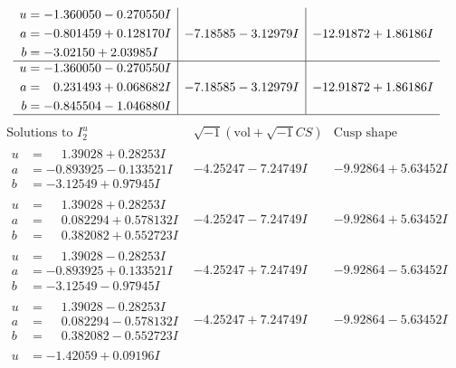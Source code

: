 \documentclass[1p]{elsarticle_modified}
\theoremstyle{definition}
\newcommand{\I}{\sqrt{-1}}
\begin{document}
$$\begin{array}{c|c|c}
\begin{aligned}
u &= -1.360050 - 0.270550 I \\
a &= -0.801459 + 0.128170 I \\
b &= -3.02150 + 2.03985 I\end{aligned}
 & -7.18585 - 3.12979 I & -12.91872 + 1.86186 I \\ \hline\begin{aligned}
u &= -1.360050 - 0.270550 I \\
a &= \phantom{-}0.231493 + 0.068682 I \\
b &= -0.845504 - 1.046880 I\end{aligned}
 & -7.18585 - 3.12979 I & -12.91872 + 1.86186 I\\
 \hline 
 \end{array}$$\newpage$$\begin{array}{c|c|c}  
\text{Solutions to }I^u_{2}& \I (\text{vol} + \sqrt{-1}CS) & \text{Cusp shape}\\
 \hline 
\begin{aligned}
u &= \phantom{-}1.39028 + 0.28253 I \\
a &= -0.893925 - 0.133521 I \\
b &= -3.12549 + 0.97945 I\end{aligned}
 & -4.25247 - 7.24749 I & -9.92864 + 5.63452 I \\ \hline\begin{aligned}
u &= \phantom{-}1.39028 + 0.28253 I \\
a &= \phantom{-}0.082294 + 0.578132 I \\
b &= \phantom{-}0.382082 + 0.552723 I\end{aligned}
 & -4.25247 - 7.24749 I & -9.92864 + 5.63452 I \\ \hline\begin{aligned}
u &= \phantom{-}1.39028 - 0.28253 I \\
a &= -0.893925 + 0.133521 I \\
b &= -3.12549 - 0.97945 I\end{aligned}
 & -4.25247 + 7.24749 I & -9.92864 - 5.63452 I \\ \hline\begin{aligned}
u &= \phantom{-}1.39028 - 0.28253 I \\
a &= \phantom{-}0.082294 - 0.578132 I \\
b &= \phantom{-}0.382082 - 0.552723 I\end{aligned}
 & -4.25247 + 7.24749 I & -9.92864 - 5.63452 I \\ \hline\begin{aligned}
u &= -1.42059 + 0.09196 I \\

\end{aligned}
\end{array}$$
\end{document}
